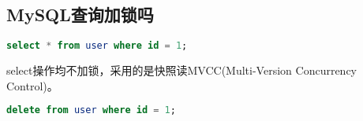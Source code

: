 \documentclass[../../../interview-questions.tex]{subfiles}
\begin{document}
\subsection{MySQL查询加锁吗}

\begin{lstlisting}[language=SQL]
select * from user where id = 1;
\end{lstlisting}

select操作均不加锁，采用的是快照读MVCC(Multi-Version Concurrency Control)。

\begin{lstlisting}[language=SQL]
delete from user where id = 1;
\end{lstlisting}
\end{document}
